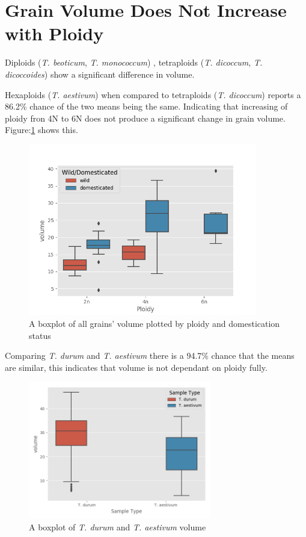 \documentclass[11pt]{report}
\begin{document}
\clearpage


\section{Grain Volume Does Not Increase with Ploidy}
\label{sec:orgff714b6}

Diploids (\emph{T. beoticum}, \emph{T. monococcum}) , tetraploids (\emph{T. dicoccum}, \emph{T. dicoccoides})  show a significant difference in volume.

Hexaploids (\emph{T. aestivum}) when compared to tetraploids (\emph{T. dicoccum}) reports a 86.2\% chance of the two means being the same. Indicating that increasing of ploidy fron 4N to 6N does not produce a significant change in grain volume. Figure:\ref{fig:org6526745} shows this.

\begin{figure}[htbp]
\centering
\includegraphics[width=10cm]{./images/results/ploidyvol.png}
\caption{\label{fig:org6526745}
A boxplot of all grains' volume plotted by ploidy and domestication status}
\end{figure}


Comparing \emph{T. durum} and \emph{T. aestivum} there is a 94.7\% chance that the means are similar, this indicates that volume is not dependant on ploidy fully.


\begin{figure}[htbp]
\centering
\includegraphics[width=8cm]{./images/results/group7/volume.png}
\caption{\label{fig:org3ca8e71}
A boxplot of \emph{T. durum} and \emph{T. aestivum} volume}
\end{figure}
\end{document}
